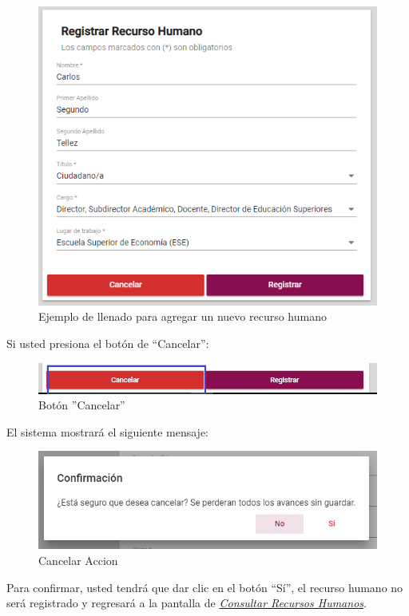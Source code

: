             \begin{figure}[H]
                \centering
                \hypertarget{ejreg}{\includegraphics[width=0.7\linewidth]{images/SP1/RegistrarLleno}}
                \caption{Ejemplo de llenado para agregar un nuevo recurso humano}
                \label{ejreg}
            \end{figure}

    \newpage
            Si usted presiona el botón de “Cancelar”:

            \begin{figure}[H]
                \centering
                \hypertarget{cancel1}{\includegraphics[width=0.7\linewidth]{images/SP1/BtnCancelar1}}
                \caption{Botón ''Cancelar''}
                \label{cancel1}
            \end{figure}

            El sistema mostrará el siguiente mensaje:


             \begin{figure}[H]
                \centering
            \includegraphics[width=0.4\linewidth]{images/SP1/MSG29}
                \caption{Cancelar Accion}
                \label{mensaje29}
            \end{figure}

            Para confirmar, usted tendrá que dar clic en el botón “Sí”, el recurso humano no será registrado y regresará a la pantalla de \hyperlink{consultarRH}{\textit{Consultar Recursos Humanos}}.

